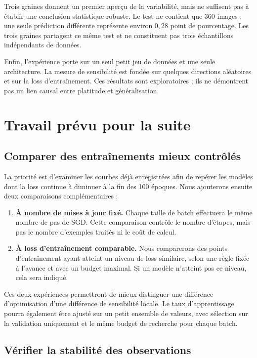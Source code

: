 \documentclass[11pt,a4paper]{article}
\begin{document}
Trois graines donnent un premier aperçu de la variabilité, mais ne suffisent pas à établir une conclusion statistique robuste. Le test ne contient que 360 images : une seule prédiction différente représente environ $0{,}28$ point de pourcentage. Les trois graines partagent ce même test et ne constituent pas trois échantillons indépendants de données.

Enfin, l'expérience porte sur un seul petit jeu de données et une seule architecture. La mesure de sensibilité est fondée sur quelques directions aléatoires et sur la loss d'entraînement. Ces résultats sont exploratoires ; ils ne démontrent pas un lien causal entre platitude et généralisation.

\section{Travail prévu pour la suite}

\subsection{Comparer des entraînements mieux contrôlés}

La priorité est d'examiner les courbes déjà enregistrées afin de repérer les modèles dont la loss continue à diminuer à la fin des 100 époques. Nous ajouterons ensuite deux comparaisons complémentaires :
\begin{enumerate}
\item \textbf{À nombre de mises à jour fixé.} Chaque taille de batch effectuera le même nombre de pas de SGD. Cette comparaison contrôle le nombre d'étapes, mais pas le nombre d'exemples traités ni le coût de calcul.
\item \textbf{À loss d'entraînement comparable.} Nous comparerons des points d'entraînement ayant atteint un niveau de loss similaire, selon une règle fixée à l'avance et avec un budget maximal. Si un modèle n'atteint pas ce niveau, cela sera indiqué.
\end{enumerate}

Ces deux expériences permettront de mieux distinguer une différence d'optimisation d'une différence de sensibilité locale. Le taux d'apprentissage pourra également être ajusté sur un petit ensemble de valeurs, avec sélection sur la validation uniquement et le même budget de recherche pour chaque batch.

\subsection{Vérifier la stabilité des observations}
\end{document}
